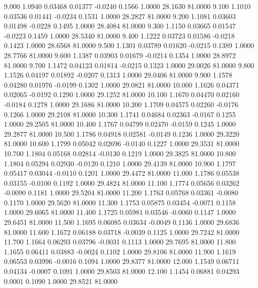    9.000   1.0940   0.03468   0.01377  -0.0240   0.1566   1.0000  28.1630  81.0000
   9.100   1.1010   0.03536   0.01441  -0.0234   0.1531   1.0000  28.2827  81.0000
   9.200   1.1081   0.03603   0.01498  -0.0228   0.1495   1.0000  28.4084  81.0000
   9.300   1.1150   0.03665   0.01547  -0.0223   0.1459   1.0000  28.5340  81.0000
   9.400   1.1222   0.03723   0.01586  -0.0218   0.1423   1.0000  28.6568  81.0000
   9.500   1.1301   0.03789   0.01620  -0.0215   0.1389   1.0000  28.7766  81.0000
   9.600   1.1387   0.03903   0.01679  -0.0214   0.1354   1.0000  28.8972  81.0000
   9.700   1.1472   0.04123   0.01814  -0.0215   0.1323   1.0000  29.0026  81.0000
   9.800   1.1526   0.04197   0.01892  -0.0207   0.1313   1.0000  29.0406  81.0000
   9.900   1.1578   0.04280   0.01976  -0.0199   0.1302   1.0000  29.0821  81.0000
  10.000   1.1626   0.04371   0.02065  -0.0192   0.1290   1.0000  29.1252  81.0000
  10.100   1.1670   0.04470   0.02160  -0.0184   0.1278   1.0000  29.1686  81.0000
  10.200   1.1709   0.04575   0.02260  -0.0176   0.1266   1.0000  29.2108  81.0000
  10.300   1.1741   0.04684   0.02363  -0.0167   0.1255   1.0000  29.2505  81.0000
  10.400   1.1767   0.04799   0.02470  -0.0159   0.1245   1.0000  29.2877  81.0000
  10.500   1.1786   0.04918   0.02581  -0.0149   0.1236   1.0000  29.3220  81.0000
  10.600   1.1799   0.05042   0.02696  -0.0140   0.1227   1.0000  29.3531  81.0000
  10.700   1.1804   0.05168   0.02814  -0.0130   0.1219   1.0000  29.3825  81.0000
  10.800   1.1804   0.05294   0.02930  -0.0120   0.1210   1.0000  29.4139  81.0000
  10.900   1.1797   0.05417   0.03044  -0.0110   0.1201   1.0000  29.4472  81.0000
  11.000   1.1786   0.05538   0.03155  -0.0100   0.1192   1.0000  29.4824  81.0000
  11.100   1.1774   0.05656   0.03262  -0.0090   0.1181   1.0000  29.5204  81.0000
  11.200   1.1763   0.05768   0.03361  -0.0080   0.1170   1.0000  29.5620  81.0000
  11.300   1.1753   0.05875   0.03454  -0.0071   0.1158   1.0000  29.6065  81.0000
  11.400   1.1725   0.05981   0.03546  -0.0060   0.1147   1.0000  29.6451  81.0000
  11.500   1.1695   0.06085   0.03634  -0.0049   0.1136   1.0000  29.6836  81.0000
  11.600   1.1672   0.06188   0.03718  -0.0039   0.1125   1.0000  29.7242  81.0000
  11.700   1.1664   0.06293   0.03796  -0.0031   0.1113   1.0000  29.7695  81.0000
  11.800   1.1655   0.06411   0.03883  -0.0024   0.1102   1.0000  29.8106  81.0000
  11.900   1.1619   0.06553   0.03996  -0.0016   0.1094   1.0000  29.8377  81.0000
  12.000   1.1549   0.06711   0.04134  -0.0007   0.1091   1.0000  29.8503  81.0000
  12.100   1.1454   0.06881   0.04293   0.0001   0.1090   1.0000  29.8521  81.0000
